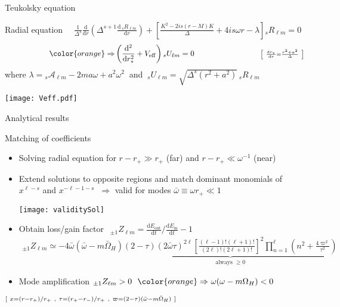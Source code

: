 \documentclass[9pt]{beamer}
\newcommand{\dd}{\mathrm{d}}
\newcommand{\uu}[3][]{ {}_{#1} #2_{#3} }
\begin{document}
\begin{frame}{Teukolsky equation}
	
	\begin{block}{Radial equation $\quad \frac{1}{\Delta^s} \frac{\dd}{\dd r} \left( \Delta^{s+1} \frac{\dd\, {}_{s}R_{\ell m}}{\dd r} \right)
+ \left[ \frac{K^2 - 2 i s (r-M)K}{\Delta} + 4 i s \omega r -\lambda \right] {}_{s}R_{\ell m} = 0$}
		$$ \hspace*{2cm} {\color{orange}\Rightarrow} \left( \frac{\dd^2}{\dd r_{*}^2} + V_\mathrm{eff} \right) {}_{s}U_{\ell m} = 0 \hspace*{3cm} {\scriptstyle \left[~\frac{\dd r_*}{\dd r} = \frac{r^2+a^2}{\Delta}~\right] } $$
		where $\lambda = {}_{s}\mathscr{A}_{\ell m} - 2 m a \omega + a^2 \omega^2~$ and $~{}_{s}U_{\ell m}=\sqrt{\Delta^s (r^2 + a^2)} \,{}_{s}R_{\ell m}~$
		
		\texttt{[image: Veff.pdf]}
	\end{block}
	
\end{frame}


\begin{frame}{Analytical results}
	
	\begin{block}{Matching of coefficients}
		\begin{itemize}
			\setlength\itemsep{0.6em}
			\item Solving radial equation for $r - r_+ \gg r_+$ (far) and $r - r_+ \ll \omega^{-1}$ (near)
			
			\item Extend solutions to opposite regions and match dominant monomials of $x^{\ell-s}$ and $x^{-\ell-1-s}$ $~\Rightarrow$ valid for modes $\bar{\omega}\equiv \omega r_+ \ll 1$
			\begin{center}
				\texttt{[image: validitySol]}
			\end{center}	
		
			\item Obtain loss/gain factor $~\boxed{\displaystyle ~{}_{\pm 1}Z_{\ell m} = \frac{\dd E_\mathrm{out}}{\dd t}\bigg/\frac{\dd E_\mathrm{in}}{\dd t} - 1~}$
			\begin{align*}
				\uu[\pm1]{Z}{\ell m} \simeq  - 4 \bar{\omega} (\bar{\omega} - m \bar{\Omega}_H) \underbrace{(2-\tau)(2\bar{\omega} \tau)^{2\ell} \left[\frac{(\ell-1)! (\ell+1)!}{(2\ell)! (2\ell+1)!}\right]^2 \prod_{n=1}^{\ell} \left(n^2 + \frac{4 \varpi^2}{\tau^2} \right)}_\text{always $\ge 0$}
			\end{align*}
			
			\item Mode amplification $\uu[\pm1]{Z}{\ell m}>0 ~~{\color{orange}\Rightarrow}~ \omega (\omega - m \Omega_H) < 0$  
		\end{itemize}
		$\scriptstyle \hfill [~ x = (r-r_{+})/r_{+} ~,~ \tau = (r_{+}-r_{-})/r_{+} ~,~ \varpi = (2-\tau)(\bar{\omega} - m \bar{\Omega}_H) ~]$
	\end{block}
	
\end{frame}
\end{document}
